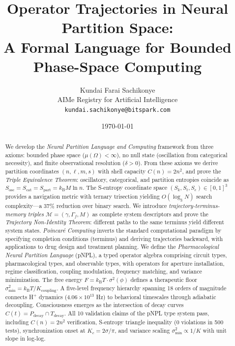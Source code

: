 \documentclass[10pt,twocolumn]{article}
\theoremstyle{remark}
\newcommand{\Sk}{S_k}
\newcommand{\St}{S_t}
\newcommand{\Se}{S_e}
\newcommand{\Gstate}{\Gamma}
\newcommand{\kB}{k_{\mathrm{B}}}
\newcommand{\Pdecay}{P_{\mathrm{decay}}}
\newcommand{\Tdecay}{T_{\mathrm{decay}}}
\newcommand{\Mstate}{\mathcal{M}}
\newcommand{\Sosc}{S_{\mathrm{osc}}}
\newcommand{\Scat}{S_{\mathrm{cat}}}
\newcommand{\Spart}{S_{\mathrm{part}}}
\begin{document}
\title{Operator Trajectories in Neural Partition Space:\\A Formal Language for Bounded Phase-Space Computing}

\author{
Kundai Farai Sachikonye\\
AIMe Registry for Artificial Intelligence\\
\texttt{kundai.sachikonye@bitspark.com}
}

\date{\today}

\maketitle


\begin{abstract}
We develop the \emph{Neural Partition Language and Computing} framework from three axioms: bounded phase space ($\mu(\Omega) < \infty$), no null state (oscillation from categorical necessity), and finite observational resolution ($\delta > 0$). From these axioms we derive partition coordinates $(n, \ell, m, s)$ with shell capacity $C(n) = 2n^2$, and prove the \emph{Triple Equivalence Theorem}: oscillatory, categorical, and partition entropies coincide as $\Sosc = \Scat = \Spart = \kB M \ln n$. The S-entropy coordinate space $(\Sk, \St, \Se) \in [0,1]^3$ provides a navigation metric with ternary trisection yielding $O(\log_3 N)$ search complexity---a 37\% reduction over binary search. We introduce \emph{trajectory-terminus-memory triples} $\Mstate = (\gamma, \Gstate_f, M)$ as complete system descriptors and prove the \emph{Trajectory Non-Identity Theorem}: different paths to the same terminus yield different system states. \emph{Poincar\'{e} Computing} inverts the standard computational paradigm by specifying completion conditions (terminus) and deriving trajectories backward, with applications to drug design and treatment planning. We define the \emph{Pharmacological Neural Partition Language} (pNPL), a typed operator algebra comprising circuit types, pharmacological types, and observable types, with operators for aperture installation, regime classification, coupling modulation, frequency matching, and variance minimization. The free energy $F = \kB T \cdot \sigma^2(\phi)$ defines a therapeutic floor $\sigma^2_{\min} = \kB T / K_{\mathrm{coupling}}$. A five-level frequency hierarchy spanning 18 orders of magnitude connects H$^+$ dynamics ($4.06 \times 10^{13}$ Hz) to behavioral timescales through adiabatic decoupling. Consciousness emerges as the intersection of decay curves $C(t) = \Pdecay \cap \Tdecay$. All 10 validation claims of the pNPL type system pass, including $C(n) = 2n^2$ verification, S-entropy triangle inequality (0 violations in 500 tests), synchronization onset at $K_c = 2\sigma/\pi$, and variance scaling $\sigma^2_{\min} \propto 1/K$ with unit slope in log-log.
\end{abstract}
\end{document}
